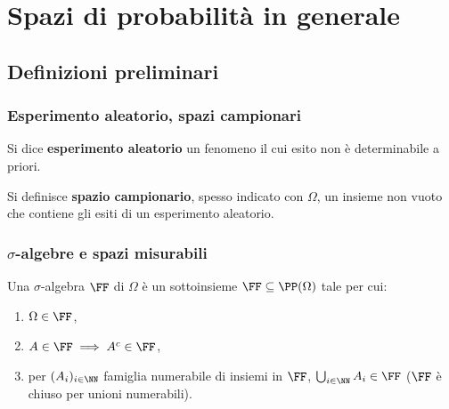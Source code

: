 \chapter{Spazi di probabilità in generale}
\setlength{\parindent}{2pt}

\begin{multicols*}{2}
    \section{Definizioni preliminari}

    \subsection{Esperimento aleatorio, spazi campionari}

    \begin{definition}
        Si dice \textbf{esperimento aleatorio} un fenomeno il cui esito
        non è determinabile a priori.
    \end{definition}
    
    \begin{definition}
        Si definisce \textbf{spazio campionario}, spesso indicato con
        $\Omega$, un insieme non vuoto che contiene gli
        esiti di un esperimento aleatorio.
    \end{definition}

    \subsection{\texorpdfstring{$\sigma$}{σ}-algebre e spazi misurabili}

    \begin{definition}
        Una $\sigma$-algebra $\FF$ di $\Omega$ è un sottoinsieme $\FF \subseteq \PP(\Omega)$ tale per cui:

        \begin{enumerate}[(i.)]
            \item $\Omega \in \FF$,
            \item $A \in \FF \implies A^c \in \FF$,
            \item per $(A_i)_{i \in \NN}$ famiglia numerabile di insiemi
                in $\FF$, $\bigcup_{i \in \NN} A_i \in \FF$ ($\FF$ è chiuso per unioni numerabili).
        \end{enumerate}
    \end{definition}


\end{multicols*}
